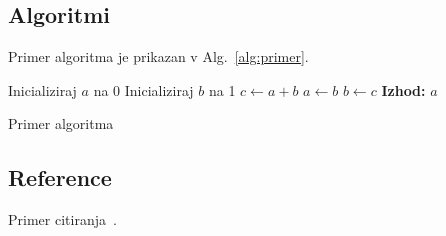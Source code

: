 \documentclass[a4paper,12pt]{article}
\begin{document}
\subsection{Algoritmi}
Primer algoritma je prikazan v Alg.~\ref{alg:primer}.

\begin{algorithm}
\begin{algorithmic}
    \State Inicializiraj $a$ na 0
    \State Inicializiraj $b$ na 1
        \State $c \gets a + b$
        \State $a \gets b$
        \State $b \gets c$
    \EndFor
    \State \textbf{Izhod:} $a$
\EndProcedure
\end{algorithmic}
\caption{Primer algoritma}
\label{alg:primer}
\end{algorithm}

\subsection{Reference}

Primer citiranja~\cite{karakativc2022strojno}.



\end{document}
